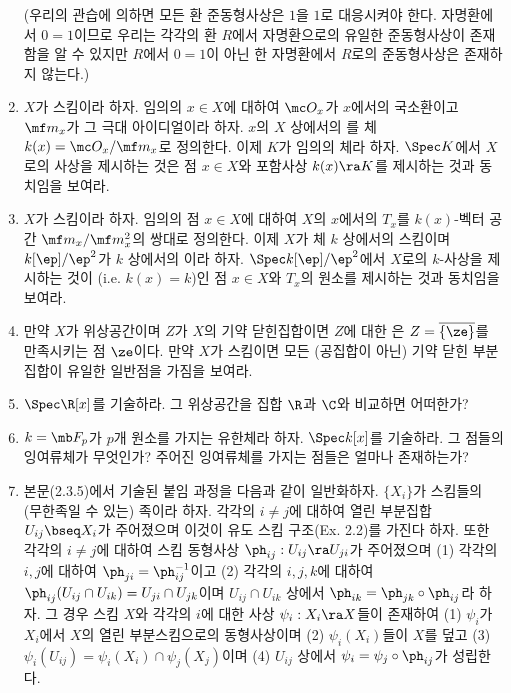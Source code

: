 \begin{enumerate}[label=\tb{2.\arabic*.},itemindent=0mm,itemsep=2mm]
	(우리의 관습에 의하면 모든 환 준동형사상은 $1$을 $1$로 대응시켜야 한다.
	자명환에서 $0=1$이므로 우리는 각각의 환 $R$에서 자명환으로의 유일한 준동형사상이 존재함을 알 수 있지만
	$R$에서 $0=1$이 아닌 한 자명환에서 $R$로의 준동형사상은 존재하지 않는다.)
	\item $X$가 스킴이라 하자. 임의의 $x\in X$에 대하여 $\mc O_x$가 $x$에서의 국소환이고 $\mf m_x$가 그 극대 아이디얼이라 하자.
	$x$의 $X$ 상에서의 를 체 $k(x)=\mc O_x/\mf m_x$로 정의한다. 이제 $K$가 임의의 체라 하자.
	$\Spec K$에서 $X$로의 사상을 제시하는 것은 점 $x\in X$와 포함사상 $k(x)\ra K$를 제시하는 것과 동치임을 보여라.
	\item $X$가 스킴이라 하자. 임의의 점 $x\in X$에 대하여 $X$의 $x$에서의  $T_x$를
	$k(x)$-벡터 공간 $\mf m_x/\mf m_x^2$의 쌍대로 정의한다.
	이제 $X$가 체 $k$ 상에서의 스킴이며 $k[\ep]/\ep^2$가 $k$ 상에서의 이라 하자.
	$\Spec k[\ep]/\ep^2$에서 $X$로의 $k$-사상을 제시하는 것이
	(i.e. $k(x)=k$)인 점 $x\in X$와 $T_x$의 원소를 제시하는 것과 동치임을 보여라.
	\item 만약 $X$가 위상공간이며 $Z$가 $X$의 기약 닫힌집합이면 $Z$에 대한 은
	$Z=\overline{\{\ze\}}$를 만족시키는 점 $\ze$이다.
	만약 $X$가 스킴이면 모든 (공집합이 아닌) 기약 닫힌 부분집합이 유일한 일반점을 가짐을 보여라.
	\item $\Spec\R[x]$를 기술하라. 그 위상공간을 집합 $\R$과 $\C$와 비교하면 어떠한가?
	\item $k=\mb F_p$가 $p$개 원소를 가지는 유한체라 하자. $\Spec k[x]$를 기술하라. 그 점들의 잉여류체가 무엇인가?
	주어진 잉여류체를 가지는 점들은 얼마나 존재하는가?
	\item {} 본문(2.3.5)에서 기술된 붙임 과정을 다음과 같이 일반화하자.
	$\{X_i\}$가 스킴들의 (무한족일 수 있는) 족이라 하자. 각각의 $i\ne j$에 대하여 열린 부분집합 $U_{ij}\bseq X_i$가 주어졌으며
	이것이 유도 스킴 구조(Ex. 2.2)를 가진다 하자.
	또한 각각의 $i\ne j$에 대하여 스킴 동형사상 $\ph_{ij}:U_{ij}\ra U_{ji}$가 주어졌으며
	(1) 각각의 $i,j$에 대하여 $\ph_{ji}=\ph_{ij}^{-1}$이고
	(2) 각각의 $i,j,k$에 대하여 $\ph_{ij}(U_{ij}\cap U_{ik})=U_{ji}\cap U_{jk}$이며
	$U_{ij}\cap U_{ik}$ 상에서 $\ph_{ik}=\ph_{jk}\circ\ph_{ij}$라 하자.
	그 경우 스킴 $X$와 각각의 $i$에 대한 사상 $\psi_i:X_i\ra X$들이 존재하여
	(1) $\psi_i$가 $X_i$에서 $X$의 열린 부분스킴으로의 동형사상이며
	(2) $\psi_i(X_i)$들이 $X$를 덮고
	(3) $\psi_i(U_{ij})=\psi_i(X_i)\cap\psi_j(X_j)$이며
	(4) $U_{ij}$ 상에서 $\psi_i=\psi_j\circ\ph_{ij}$가 성립한다.

\end{enumerate}
